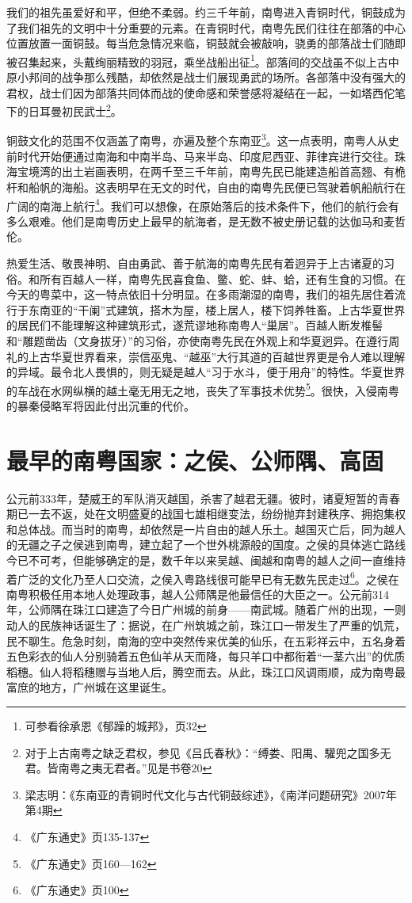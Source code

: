我们的祖先虽爱好和平，但绝不柔弱。约三千年前，南粤进入青铜时代，铜鼓成为了我们祖先的文明中十分重要的元素。在青铜时代，南粤先民们往往在部落的中心位置放置一面铜鼓。每当危急情况来临，铜鼓就会被敲响，骁勇的部落战士们随即被召集起来，头戴绚丽精致的羽冠，乘坐战船出征\footnote{可参看徐承恩《郁躁的城邦》，页32}。部落间的交战虽不似上古中原小邦间的战争那么残酷，却依然是战士们展现勇武的场所。各部落中没有强大的君权，战士们因为部落共同体而战的使命感和荣誉感将凝结在一起，一如塔西佗笔下的日耳曼初民武士\footnote{对于上古南粤之缺乏君权，参见《吕氏春秋》：“缚娄、阳禺、驩兜之国多无君。皆南粤之夷无君者。”见是书卷20}。

铜鼓文化的范围不仅涵盖了南粤，亦遍及整个东南亚\footnote{梁志明：《东南亚的青铜时代文化与古代铜鼓综述》，《南洋问题研究》2007年第4期}。这一点表明，南粤人从史前时代开始便通过南海和中南半岛、马来半岛、印度尼西亚、菲律宾进行交往。珠海宝境湾的出土岩画表明，在两千至三千年前，南粤先民已能建造船首高翘、有桅杆和船帆的海船。这表明早在无文的时代，自由的南粤先民便已驾驶着帆船航行在广阔的南海上航行\footnote{《广东通史》页135-137}。我们可以想像，在原始落后的技术条件下，他们的航行会有多么艰难。他们是南粤历史上最早的航海者，是无数不被史册记载的达伽马和麦哲伦。

热爱生活、敬畏神明、自由勇武、善于航海的南粤先民有着迥异于上古诸夏的习俗。和所有百越人一样，南粤先民喜食鱼、鳖、蛇、蚌、蛤，还有生食的习惯。在今天的粤菜中，这一特点依旧十分明显。在多雨潮湿的南粤，我们的祖先居住着流行于东南亚的“干阑”式建筑，搭木为屋，楼上居人，楼下饲养牲畜。上古华夏世界的居民们不能理解这种建筑形式，遂荒谬地称南粤人“巢居”。百越人断发椎髻和“雕题凿齿（文身拔牙）”的习俗，亦使南粤先民在外观上和华夏迥异。在遵行周礼的上古华夏世界看来，崇信巫鬼、“越巫”大行其道的百越世界更是令人难以理解的异域。最令北人畏惧的，则无疑是越人“习于水斗，便于用舟”的特性。华夏世界的车战在水网纵横的越土毫无用无之地，丧失了军事技术优势\footnote{《广东通史》页160—162}。很快，入侵南粤的暴秦侵略军将因此付出沉重的代价。

\section{最早的南粤国家：之侯、公师隅、高固}

公元前333年，楚威王的军队消灭越国，杀害了越君无疆。彼时，诸夏短暂的青春期已一去不返，处在文明盛夏的战国七雄相继变法，纷纷抛弃封建秩序、拥抱集权和总体战。而当时的南粤，却依然是一片自由的越人乐土。越国灭亡后，同为越人的无疆之子之侯逃到南粤，建立起了一个世外桃源般的国度。之侯的具体逃亡路线今已不可考，但能够确定的是，数千年以来吴越、闽越和南粤的越人之间一直维持着广泛的文化乃至人口交流，之侯入粤路线很可能早已有无数先民走过\footnote{《广东通史》页100}。之侯在南粤积极任用本地人处理政事，越人公师隅是他最信任的大臣之一。公元前314年，公师隅在珠江口建造了今日广州城的前身——南武城。随着广州的出现，一则动人的民族神话诞生了：据说，在广州筑城之前，珠江口一带发生了严重的饥荒，民不聊生。危急时刻，南海的空中突然传来优美的仙乐，在五彩祥云中，五名身着五色彩衣的仙人分别骑着五色仙羊从天而降，每只羊口中都衔着“一茎六出”的优质稻穗。仙人将稻穗赠与当地人后，腾空而去。从此，珠江口风调雨顺，成为南粤最富庶的地方，广州城在这里诞生。

